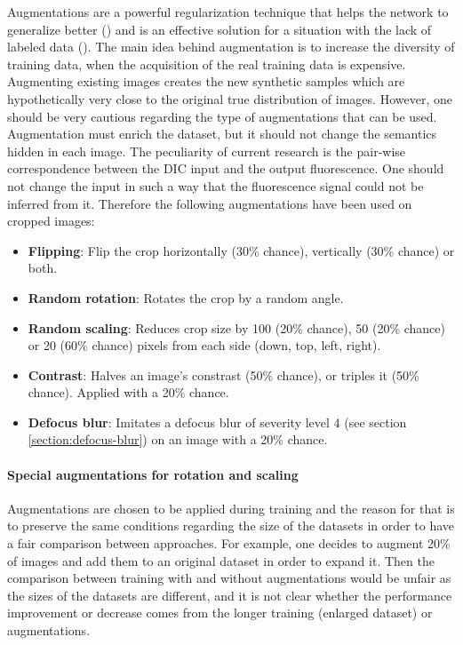 Augmentations are a powerful regularization technique that helps the network to generalize better (\cite{Perez_Wang_2017}) and is an effective solution for a situation with the lack of labeled data (\cite{Yang_2022}). The main idea behind augmentation is to increase the diversity of training data, when the acquisition of the real training data is expensive. Augmenting existing images creates the new synthetic samples which are hypothetically very close to the original true distribution of images. However, one should be very cautious regarding the type of augmentations that can be used. Augmentation must enrich the dataset, but it should not change the semantics hidden in each image. The peculiarity of current research is the pair-wise correspondence between the DIC input and the output fluorescence. One should not change the input in such a way that the fluorescence signal could not be inferred from it. Therefore the following augmentations have been used on cropped images:

\begin{itemize}
	\item \textbf{Flipping}: Flip the crop horizontally (30\% chance), vertically (30\% chance) or both.
	\item \textbf{Random rotation}: Rotates the crop by a random angle.
	\item \textbf{Random scaling}: Reduces crop size by 100 (20\% chance), 50 (20\% chance) or 20 (60\% chance) pixels from each side (down, top, left, right).
	\item \textbf{Contrast}: Halves an image's constrast (50\% chance), or triples it (50\% chance). Applied with a 20\% chance.
	\item \textbf{Defocus blur}: Imitates a defocus blur of severity level 4 (see section \ref{section:defocus-blur}) on an image with a 20\% chance.
\end{itemize}

\paragraph{Special augmentations for rotation and scaling}

Augmentations are chosen to be applied during training and the reason for that is to preserve the same conditions regarding the size of the datasets in order to have a fair comparison between approaches. For example, one decides to augment 20\% of images and add them to an original dataset in order to expand it. Then the comparison between training with and without augmentations would be unfair as the sizes of the datasets are different, and it is not clear whether the performance improvement or decrease comes from the longer training (enlarged dataset) or augmentations.

